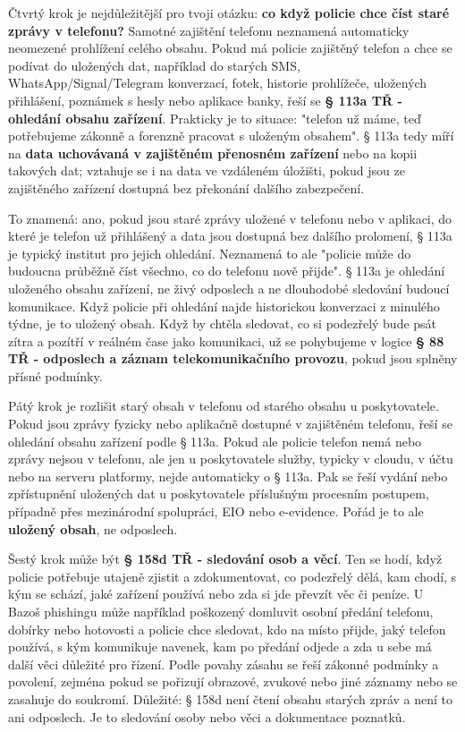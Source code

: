 \documentclass[11pt,a4paper]{article}
\begin{document}
{Čtvrtý krok je nejdůležitější pro tvoji otázku: \textbf{co když policie chce číst staré zprávy v telefonu?} Samotné zajištění telefonu neznamená automaticky neomezené prohlížení celého obsahu. Pokud má policie zajištěný telefon a chce se podívat do uložených dat, například do starých SMS, WhatsApp/Signal/Telegram konverzací, fotek, historie prohlížeče, uložených přihlášení, poznámek s hesly nebo aplikace banky, řeší se \textbf{§ 113a TŘ - ohledání obsahu zařízení}. Prakticky je to situace: "telefon už máme, teď potřebujeme zákonně a forenzně pracovat s uloženým obsahem". § 113a tedy míří na \textbf{data uchovávaná v zajištěném přenosném zařízení} nebo na kopii takových dat; vztahuje se i na data ve vzdáleném úložišti, pokud jsou ze zajištěného zařízení dostupná bez překonání dalšího zabezpečení.

To znamená: ano, pokud jsou staré zprávy uložené v telefonu nebo v aplikaci, do které je telefon už přihlášený a data jsou dostupná bez dalšího prolomení, § 113a je typický institut pro jejich ohledání. Neznamená to ale "policie může do budoucna průběžně číst všechno, co do telefonu nově přijde". § 113a je ohledání uloženého obsahu zařízení, ne živý odposlech a ne dlouhodobé sledování budoucí komunikace. Když policie při ohledání najde historickou konverzaci z minulého týdne, je to uložený obsah. Když by chtěla sledovat, co si podezřelý bude psát zítra a pozítří v reálném čase jako komunikaci, už se pohybujeme v logice \textbf{§ 88 TŘ - odposlech a záznam telekomunikačního provozu}, pokud jsou splněny přísné podmínky.

Pátý krok je rozlišit starý obsah v telefonu od starého obsahu u poskytovatele. Pokud jsou zprávy fyzicky nebo aplikačně dostupné v zajištěném telefonu, řeší se ohledání obsahu zařízení podle § 113a. Pokud ale policie telefon nemá nebo zprávy nejsou v telefonu, ale jen u poskytovatele služby, typicky v cloudu, v účtu nebo na serveru platformy, nejde automaticky o § 113a. Pak se řeší vydání nebo zpřístupnění uložených dat u poskytovatele příslušným procesním postupem, případně přes mezinárodní spolupráci, EIO nebo e-evidence. Pořád je to ale \textbf{uložený obsah}, ne odposlech.

Šestý krok může být \textbf{§ 158d TŘ - sledování osob a věcí}. Ten se hodí, když policie potřebuje utajeně zjistit a zdokumentovat, co podezřelý dělá, kam chodí, s kým se schází, jaké zařízení používá nebo zda si jde převzít věc či peníze. U Bazoš phishingu může například poškozený domluvit osobní předání telefonu, dobírky nebo hotovosti a policie chce sledovat, kdo na místo přijde, jaký telefon používá, s kým komunikuje navenek, kam po předání odjede a zda u sebe má další věci důležité pro řízení. Podle povahy zásahu se řeší zákonné podmínky a povolení, zejména pokud se pořizují obrazové, zvukové nebo jiné záznamy nebo se zasahuje do soukromí. Důležité: § 158d není čtení obsahu starých zpráv a není to ani odposlech. Je to sledování osoby nebo věci a dokumentace poznatků.

}
\end{document}

